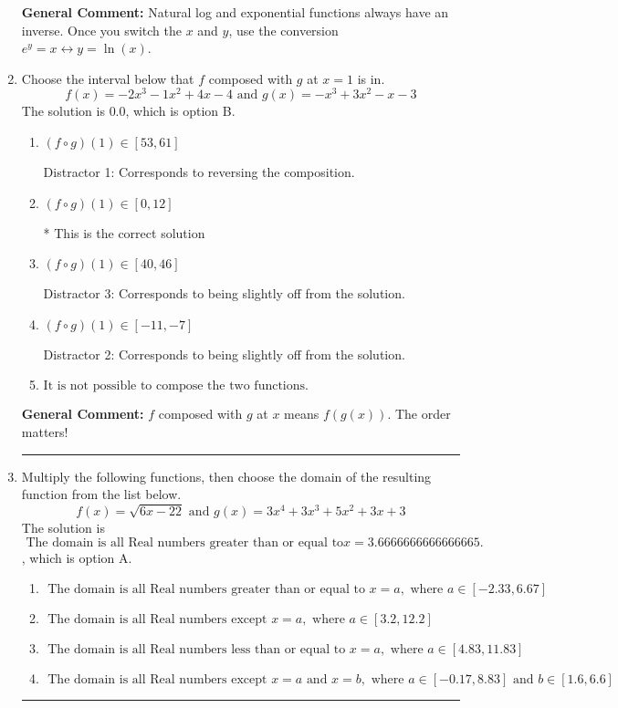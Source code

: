 \documentclass{extbook}[14pt]
\newcommand{\litem}[1]{\item #1

\rule{\textwidth}{0.4pt}}
\begin{document}
\begin{enumerate}
{\textbf{General Comment:} Natural log and exponential functions always have an inverse. Once you switch the $x$ and $y$, use the conversion $ e^y = x \leftrightarrow y=\ln(x)$.
}
\litem{
Choose the interval below that $f$ composed with $g$ at $x=1$ is in.
\[ f(x) = -2x^{3} -1 x^{2} +4 x -4 \text{ and } g(x) = -x^{3} +3 x^{2} -x -3 \]
The solution is \( 0.0 \), which is option B.\begin{enumerate}[label=\Alph*.]
\item \( (f \circ g)(1) \in [53, 61] \)

 Distractor 1: Corresponds to reversing the composition.
\item \( (f \circ g)(1) \in [0, 12] \)

* This is the correct solution
\item \( (f \circ g)(1) \in [40, 46] \)

 Distractor 3: Corresponds to being slightly off from the solution.
\item \( (f \circ g)(1) \in [-11, -7] \)

 Distractor 2: Corresponds to being slightly off from the solution.
\item \( \text{It is not possible to compose the two functions.} \)


\end{enumerate}

\textbf{General Comment:} $f$ composed with $g$ at $x$ means $f(g(x))$. The order matters!
}
\litem{
Multiply the following functions, then choose the domain of the resulting function from the list below.
\[ f(x) = \sqrt{6x-22}  \text{ and } g(x) = 3x^{4} +3 x^{3} +5 x^{2} +3 x + 3 \]
The solution is \( \text{ The domain is all Real numbers greater than or equal to} x = 3.6666666666666665. \), which is option A.\begin{enumerate}[label=\Alph*.]
\item \( \text{ The domain is all Real numbers greater than or equal to } x = a, \text{ where } a \in [-2.33, 6.67] \)


\item \( \text{ The domain is all Real numbers except } x = a, \text{ where } a \in [3.2, 12.2] \)


\item \( \text{ The domain is all Real numbers less than or equal to } x = a, \text{ where } a \in [4.83, 11.83] \)


\item \( \text{ The domain is all Real numbers except } x = a \text{ and } x = b, \text{ where } a \in [-0.17, 8.83] \text{ and } b \in [1.6, 6.6] \)



\end{enumerate}}
\end{enumerate}
\end{document}
